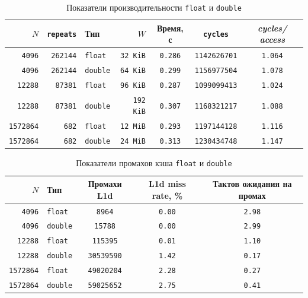 \begin{table}[H]
\caption{Показатели производительности \texttt{float} и \texttt{double}}
\label{tab:data-type}
\small
\begin{tabularx}{\textwidth}{|r|r|l|r|C|C|C|}
	\hline
	$N$ & \texttt{repeats} & Тип & $W$ & Время, с & \texttt{cycles} & \textit{cycles/ access} \\
	\hline
	\texttt{4096} & \texttt{262144} & \texttt{float} & \texttt{32 KiB} & \texttt{0.286} & \texttt{1142626701} & \texttt{1.064} \\
	\hline
	\texttt{4096} & \texttt{262144} & \texttt{double} & \texttt{64 KiB} & \texttt{0.299} & \texttt{1156977504} & \texttt{1.078} \\
	\hline
	\texttt{12288} & \texttt{87381} & \texttt{float} & \texttt{96 KiB} & \texttt{0.287} & \texttt{1099099413} & \texttt{1.024} \\
	\hline
	\texttt{12288} & \texttt{87381} & \texttt{double} & \texttt{192 KiB} & \texttt{0.307} & \texttt{1168321217} & \texttt{1.088} \\
	\hline
	\texttt{1572864} & \texttt{682} & \texttt{float} & \texttt{12 MiB} & \texttt{0.293} & \texttt{1197144128} & \texttt{1.116} \\
	\hline
	\texttt{1572864} & \texttt{682} & \texttt{double} & \texttt{24 MiB} & \texttt{0.313} & \texttt{1230434748} & \texttt{1.147} \\
	\hline
\end{tabularx}
\end{table}

\begin{table}[H]
\caption{Показатели промахов кэша \texttt{float} и \texttt{double}}
\label{tab:data-type-cache}
\small
\begin{tabularx}{\textwidth}{|r|l|C|C|C|}
	\hline
	$N$ & Тип & Промахи L1d & L1d miss rate, \% & Тактов ожидания на промах \\
	\hline
	\texttt{4096} & \texttt{float} & \texttt{8964} & \texttt{0.00} & \texttt{2.98} \\
	\hline
	\texttt{4096} & \texttt{double} & \texttt{15788} & \texttt{0.00} & \texttt{2.99} \\
	\hline
	\texttt{12288} & \texttt{float} & \texttt{115395} & \texttt{0.01} & \texttt{1.10} \\
	\hline
	\texttt{12288} & \texttt{double} & \texttt{30539590} & \texttt{1.42} & \texttt{0.17} \\
	\hline
	\texttt{1572864} & \texttt{float} & \texttt{49020204} & \texttt{2.28} & \texttt{0.27} \\
	\hline
	\texttt{1572864} & \texttt{double} & \texttt{59025652} & \texttt{2.75} & \texttt{0.41} \\
	\hline
\end{tabularx}
\end{table}

